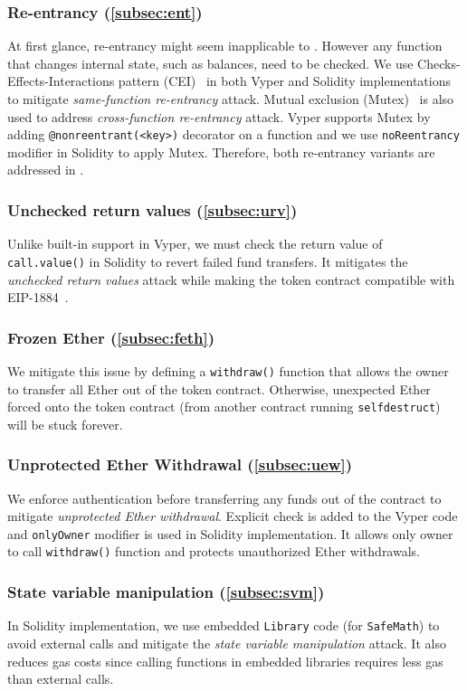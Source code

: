 \subsubsection{Re-entrancy (\ref{subsec:ent})} 
At first glance, re-entrancy might seem inapplicable to \erc. However any function that changes internal state, such as balances, need to be checked. We use Checks-Effects-Interactions pattern (CEI)~\cite{CEI} in both Vyper and Solidity implementations to mitigate \textit{same-function re-entrancy} attack. Mutual exclusion (Mutex)~\cite{WiKiMutex} is also used to address \textit{cross-function re-entrancy} attack. Vyper supports Mutex by adding \texttt{@nonreentrant(<key>)} decorator on a function and we use \texttt{noReentrancy} modifier in Solidity to apply Mutex. Therefore, both re-entrancy variants are addressed in \sys. 
 
\subsubsection{Unchecked return values (\ref{subsec:urv})}
Unlike built-in support in Vyper, we must check the return value of \texttt{call.value()} in Solidity to revert failed fund transfers. It mitigates the \textit{unchecked return values} attack while making the token contract compatible with EIP-1884~\cite{EIP1884}. 

\subsubsection{Frozen Ether (\ref{subsec:feth})}
We mitigate this issue by defining a \texttt{withdraw()} function that allows the owner to transfer all Ether out of the token contract. Otherwise, unexpected Ether forced onto the token contract (\eg from another contract running \texttt{selfdestruct}) will be stuck forever. 

\subsubsection{Unprotected Ether Withdrawal (\ref{subsec:uew})}
We enforce authentication before transferring any funds out of the contract to mitigate \textit{unprotected Ether withdrawal}. Explicit check is added to the Vyper code and \texttt{onlyOwner} modifier is used in Solidity implementation. It allows only owner to call \texttt{withdraw()} function and protects unauthorized Ether withdrawals. 

\subsubsection{State variable manipulation (\ref{subsec:svm})}
In Solidity implementation, we use embedded \texttt{Library} code (for \texttt{SafeMath}) to avoid external calls and mitigate the \textit{state variable manipulation} attack. It also reduces gas costs since calling functions in embedded libraries requires less gas than external calls.
	
